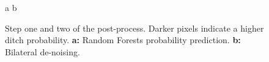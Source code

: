 \documentclass[11pt, review]{elsarticle} %
\begin{document}
\begin{figure} [!htb]
    \centering
    a{
        }\hspace{5pt}
    b{
        }
    \caption{Step one and two of the post-process. Darker pixels indicate a higher ditch probability. \textbf{a: }Random Forests probability prediction. \textbf{b: }Bilateral de-noising.}
    \label{fig:postprocessing1}
\end{figure}
\end{document}
